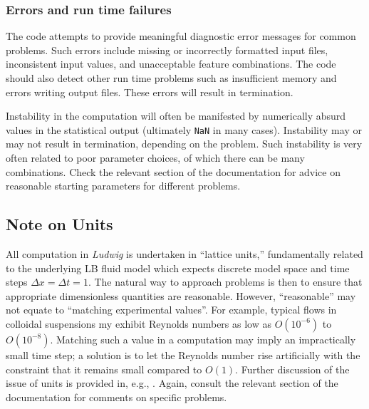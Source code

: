\subsubsection{Errors and run time failures}

The code attempts to provide meaningful diagnostic error messages
for common problems. Such errors include missing or incorrectly
formatted input files, inconsistent input values, and unacceptable
feature combinations. The code should also detect other run time
problems such as insufficient memory and errors writing output
files. These errors will result in termination.

Instability in the computation will often be manifested by numerically
absurd values in the statistical output (ultimately \texttt{NaN} in
many cases). Instability may or may not result in termination, depending
on the problem. Such instability is very often related to poor parameter
choices, of which there can be many combinations. Check the
relevant section of the documentation for advice on reasonable starting
parameters for different problems.


\subsection{Note on Units}

All computation in \textit{Ludwig} is undertaken in ``lattice
units,'' fundamentally related to the underlying LB fluid model
which expects discrete model space and time steps
$\Delta x = \Delta t = 1$. The natural way to approach problems
is then to ensure that appropriate dimensionless quantities are
reasonable. However, ``reasonable'' may not equate to ``matching
experimental values''. For example, typical flows in colloidal
suspensions my exhibit Reynolds numbers as low as $O(10^{-6})$
to $O(10^{-8})$.
Matching such a value in a computation may imply an impractically
small time step; a solution is to let the Reynolds number rise
artificially with the constraint that it remains small compared to $O(1)$.
Further discussion of the issue of units is provided in, e.g.,
\cite{cates_scaling}. Again, consult the relevant section of the documentation
for comments on specific problems.


\vfill
\pagebreak
